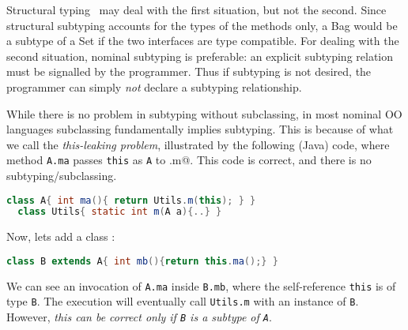 Structural typing~\cite{cook} may deal with the first
situation, but not the second. Since structural subtyping
accounts for the types of the methods only, a Bag would be a subtype
of a Set if the two interfaces are type compatible. For dealing with
the second situation, nominal subtyping is preferable: an explicit subtyping relation must be signalled by the programmer. Thus if subtyping is not desired, the
programmer can simply \emph{not} declare a subtyping relationship.

While there is no problem in subtyping without subclassing, in most nominal OO languages subclassing fundamentally implies subtyping. 
This is because of what we call the
\emph{this-leaking problem}, illustrated by the following
(Java) code, where
method \lstinline{A.ma} passes \lstinline{this} as \lstinline{A} to \Q@Utils.m@.
This code is correct, and there is no subtyping/subclassing{.}
\begin{lstlisting}[language=Java]
  class A{ int ma(){ return Utils.m(this); } }
  class Utils{ static int m(A a){..} }
\end{lstlisting}
Now, lets add a class \Q@B@:
\begin{lstlisting}[language=Java]
  class B extends A{ int mb(){return this.ma();} }  
\end{lstlisting}
We can see an invocation of \lstinline{A.ma} inside
\lstinline{B.mb}, where the self-reference \lstinline{this} is of type \lstinline{B}. 
The execution will eventually call \lstinline{Utils.m} with an
instance of \lstinline{B}. However, \emph{this can be correct only if \lstinline{B} is a subtype of
\lstinline{A}}. 

%
%


